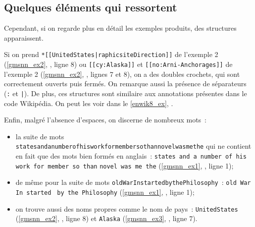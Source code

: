 \subsection{Quelques éléments qui ressortent}
Cependant, si on regarde plus en détail les exemples produits, des structures apparaissent. 

Si on prend \lstinline!*[[UnitedStates|raphicsiteDirection]]! de l'exemple 2 (\autoref{gmsnn_ex2}, , ligne 8) ou 
\lstinline![[cy:Alaska]]! et \lstinline![[no:Arni-Anchorages]]! de l'exemple 2 (\autoref{gmsnn_ex2}, , lignes 7 et 8), on a des doubles crochets, qui sont correctement ouverts puis fermés. On remarque aussi la présence de séparateurs (\lstinline!:! et \lstinline!|!). De plus, ces structures sont similaire aux annotations présentes dans le code Wikipédia.
On peut les voir dans le \autoref{enwik8_ex}, .

Enfin, malgré l'absence d'espaces, on discerne de nombreux mots~:
\begin{itemize}
	\item la suite de mots \lstinline!statesandanumberofhisworkformembersothannovelwasmethe! qui ne contient en fait que des mots bien formés en anglais~: \lstinline!states and a number of his work for member so than! \lstinline!novel was me the! (\autoref{gmsnn_ex1}, , ligne 1);
	\item de même pour la suite de mots \lstinline!oldWarInstartedbythePhilosophy!~: \lstinline!old War In started! \lstinline! by the Philosophy!
	(\autoref{gmsnn_ex1}, , ligne 1);
	\item on trouve aussi des noms propres comme le nom de pays~: \lstinline!UnitedStates! (\autoref{gmsnn_ex2}, , ligne 8) et \lstinline!Alaska! (\autoref{gmsnn_ex3}, , ligne 7).
\end{itemize}